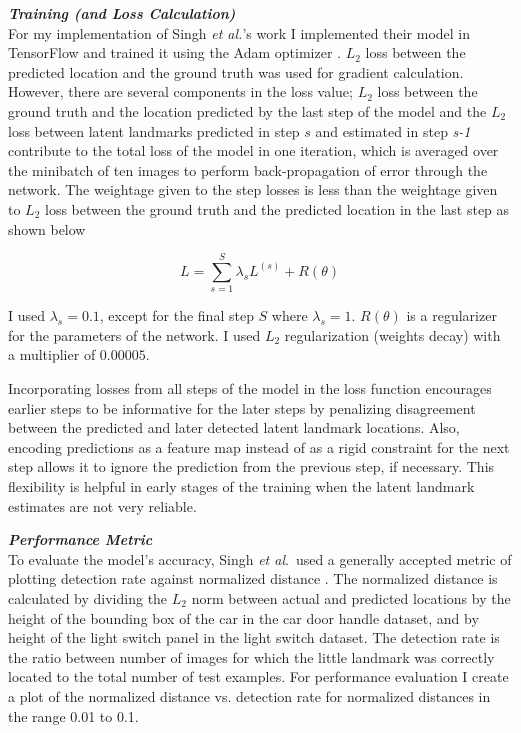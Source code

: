 \documentclass [11pt,letterpaper ,twoside ,openany ]{report}
\begin{document}
    \noindent
    \textbf{\textit{Training (and Loss Calculation)}}\\
    For my implementation of Singh \textit{et al.}'s work I implemented their model in TensorFlow and trained it using the Adam optimizer \cite{kingma2014adam}. \(L_2\) loss between the predicted location and the ground truth was used for gradient calculation. However, there are several components in the loss value; \(L_2\) loss between the ground truth and the location predicted by the last step of the model and the \(L_2\) loss between latent landmarks predicted in step \(s\) and estimated in step \textit {s-1} contribute to the total loss of the model in one iteration, which is averaged over the minibatch of ten images to perform back-propagation of error through the network. The weightage given to the step losses is less than the weightage given to \(L_2\) loss between the ground truth and the predicted location in the last step as shown below

    \[ L =  \displaystyle\sum_{s=1}^{S} \lambda _s L^{(s)} + R(\theta)\]

    \noindent
    I used \( \lambda _s = 0.1 \), except for the final step \(S\) where \( \lambda _s = 1\).  \( R(\theta) \) is a regularizer for the parameters of the network. I used \(L_2\) regularization (weights decay) with a multiplier of \(0.00005\). 
        
    Incorporating losses from all steps of the model in the loss function encourages earlier steps to be informative for the later steps by penalizing disagreement between the predicted and later detected latent landmark locations. Also, encoding predictions as a feature map instead of as a rigid constraint for the next step allows it to ignore the prediction from the previous step, if necessary. This flexibility is helpful in early stages of the training when the latent landmark estimates are not very reliable.

    \noindent
    \textbf{\textit{Performance Metric}}\\
    To evaluate the model's accuracy, Singh \textit{et al}.\ used a generally accepted metric of plotting detection rate against normalized distance  \cite{godil2014performance}. The normalized distance is calculated by dividing the \(L_2\) norm between actual and predicted locations by the height of the bounding box of the car in the car door handle dataset,  and by height of the light switch panel in the light switch dataset. The detection rate is the ratio between number of images for which the little landmark was correctly located to the total number of test examples. For performance evaluation I create a plot of the normalized distance vs. detection rate for normalized distances in the range 0.01 to 0.1.
\end{document}
